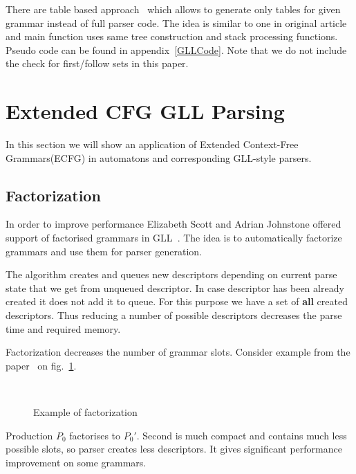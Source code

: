 \documentclass[runningheads,a4paper]{llncs}
\begin{document}
There are table based approach~\cite{ragozina} which allows to generate only tables for given grammar instead of full parser code.
The idea is similar to one in original article and main function uses same tree construction and stack processing functions.
Pseudo code can be found in appendix~\ref{GLLCode}. Note that we do not include the check for first/follow sets in this paper.




\section{Extended CFG GLL Parsing}%

In this section we will show an application of Extended Context-Free Grammars(ECFG) in automatons and corresponding GLL-style parsers.

\subsection{Factorization}%

In order to improve performance Elizabeth Scott and Adrian Johnstone offered support of factorised grammars in GLL~\cite{scott2016structuring}. 
The idea is to automatically factorize grammars and use them for parser generation. 

The algorithm creates and queues new descriptors depending on current parse state that we get from unqueued descriptor. 
In case descriptor has been already created it does not add it to queue. For this purpose we have a set of
\textbf{all} created descriptors. Thus reducing a number of possible descriptors decreases the parse time
and required memory.

Factorization decreases the number of grammar slots. 
Consider example from the paper~\cite{scott2016structuring} on fig.~\ref{fig:ExampleOfFactorization}.

\begin{figure}
    \centering
    ~
    \caption{Example of factorization}
    \label{fig:ExampleOfFactorization}
\end{figure}
Production $P_0$ factorises to $P_0'$.
Second is much compact and contains much less possible slots, 
so parser creates less descriptors.
It gives significant performance improvement on some grammars.
\end{document}
